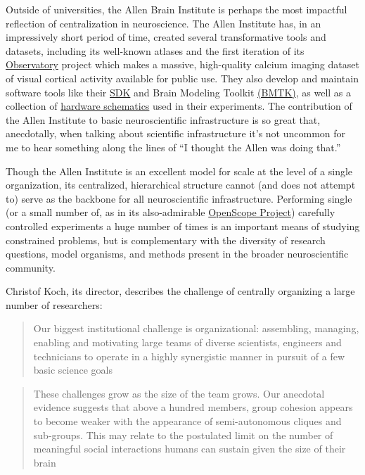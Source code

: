 \documentclass[10pt]{article}
\begin{document}
\begin{multicols}{2}
Outside of universities, the Allen Brain Institute is perhaps the most
impactful reflection of centralization in neuroscience. The Allen
Institute has, in an impressively short period of time, created several
transformative tools and datasets, including its well-known atlases \cite{leinGenomewideAtlasGene2007}  and the first iteration of its
\href{http://observatory.brain-map.org/}{Observatory} project which
makes a massive, high-quality calcium imaging dataset of visual cortical
activity available for public use. They also develop and maintain
software tools like their
\href{https://allensdk.readthedocs.io/en/latest/}{SDK} and Brain
Modeling Toolkit \href{https://alleninstitute.github.io/bmtk/}{(BMTK)},
as well as a collection of
\href{https://portal.brain-map.org/explore/toolkit/hardware}{hardware
schematics} used in their experiments. The contribution of the Allen
Institute to basic neuroscientific infrastructure is so great that,
anecdotally, when talking about scientific infrastructure it's not
uncommon for me to hear something along the lines of ``I thought the
Allen was doing that.''

Though the Allen Institute is an excellent model for scale at the level
of a single organization, its centralized, hierarchical structure cannot
(and does not attempt to) serve as the backbone for all neuroscientific
infrastructure. Performing single (or a small number of, as in its
also-admirable
\href{https://alleninstitute.org/what-we-do/brain-science/news-press/articles/three-collaborative-studies-launch-openscope-shared-observatory-neuroscience}{OpenScope
Project}) carefully controlled experiments a huge number of times is an
important means of studying constrained problems, but is complementary
with the diversity of research questions, model organisms, and methods
present in the broader neuroscientific community.

Christof Koch, its director, describes the challenge of centrally
organizing a large number of researchers:

\begin{quote}
Our biggest institutional challenge is organizational: assembling,
managing, enabling and motivating large teams of diverse scientists,
engineers and technicians to operate in a highly synergistic manner in
pursuit of a few basic science goals \cite{grillnerWorldwideInitiativesAdvance2016} 
\end{quote}

\begin{quote}
These challenges grow as the size of the team grows. Our anecdotal
evidence suggests that above a hundred members, group cohesion appears
to become weaker with the appearance of semi-autonomous cliques and
sub-groups. This may relate to the postulated limit on the number of
meaningful social interactions humans can sustain given the size of
their brain \cite{kochBigScienceTeam2016} 
\end{quote}


\end{multicols}
\end{document}
